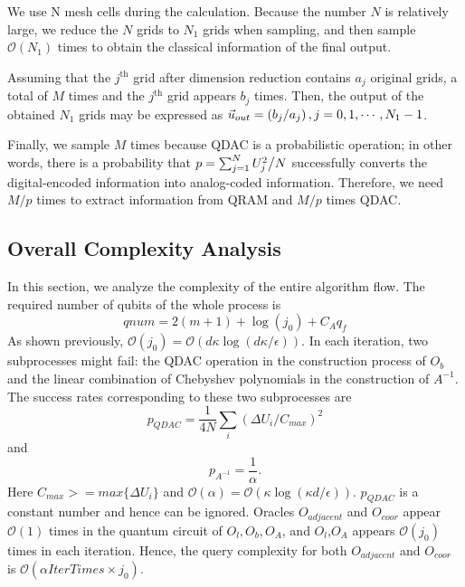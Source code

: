 \documentclass[%
 reprint,
 amsmath,amssymb,
pra,
]{revtex4-1}
\begin{document}
We use N mesh cells during the calculation. Because the number $N$ is relatively large, we reduce the $N$ grids to $N_1$ grids when sampling, and then sample $\mathcal{O}(N_1)$ times to obtain the classical information of the final output.

Assuming that the $j^{\text{th}}$ grid after dimension reduction contains $a_j$ original grids, a total of $M$ times and the $j^{\text{th}}$ grid appears $b_j$ times. Then, the output of the obtained $N_1$ grids may be expressed as ${\vec u_{out}} = \left( {{{{b_j}} \mathord{\left/ {\vphantom {{{b_j}} {{a_j}}}} \right. \kern-\nulldelimiterspace} {{a_j}}}} \right),j = 0,1, \cdots ,{N_1} - 1$.

Finally, we sample $M$ times because QDAC is a probabilistic operation; in other words, there is a probability that $p = \sum\nolimits_{j = 1}^N {{{U_j^2} \mathord{\left/{\vphantom {{U_j^2} N}} \right. \kern-\nulldelimiterspace} N}} $ successfully converts the digital-encoded information into analog-coded information. Therefore, we need $M/p$ times to extract information from QRAM and $M/p$ times QDAC.
\subsection{Overall Complexity Analysis}

In this section, we analyze the complexity of the entire algorithm flow. The required number of qubits of the whole process is 
\begin{equation}
qnum=2(m+1)+\log(j_0)+C_Aq_f
\end{equation}
As shown previously, $\mathcal{O}(j_0)=\mathcal{O}(d\kappa\log(d\kappa/\epsilon))$. In each iteration, two subprocesses might fail: the QDAC operation in the construction process of $O_b$ and the linear combination of Chebyshev polynomials in the construction of $A^{-1}$. The success rates corresponding to these two subprocesses are
\begin{equation}
p_{QDAC}=\frac{1}{4N}\sum_i{(\Delta U_i/C_{max})^2}
\end{equation}
and
\begin{equation}
p_{A^{-1}}=\frac{1}{\alpha}.
\end{equation}
Here $C_{max}>=max\{\Delta U_i\}$ and $\mathcal{O}(\alpha)=\mathcal{O}(\kappa\log(\kappa d/\epsilon))$. $p_{QDAC}$ is a constant number and hence can be ignored. Oracles $O_{adjacent}$ and $O_{coor}$ appear $\mathcal{O}(1)$ times in the quantum circuit of $O_l,O_b,O_A$, and $O_l$,$O_A$ appears $\mathcal{O}(j_0)$ times in each iteration. Hence, the query complexity for both $O_{adjacent}$ and $O_{coor}$ is $\mathcal{O}(\alpha IterTimes\times j_0)$.
\end{document}
